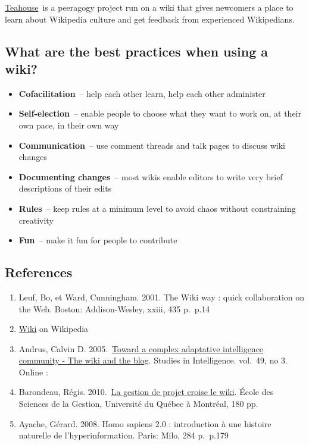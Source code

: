 \href{http://en.wikipedia.org/wiki/Wikipedia:Teahouse}{Teahouse}~is a
peeragogy project run on a wiki that gives newcomers a place to learn
about Wikipedia culture and get feedback from experienced Wikipedians.

\subsection{What are the best practices when using a
wiki?}\label{what-are-the-best-practices-when-using-a-wiki}

\begin{itemize}
\itemsep1pt\parskip0pt
\item
  \textbf{Cofacilitation}~-- help each other learn, help each other
  administer
\item
  \textbf{Self-election}~-- enable people to choose what they want to
  work on, at their own pace, in their own way
\item
  \textbf{Communication}~-- use comment threads and talk pages to
  discuss wiki changes
\item
  \textbf{Documenting changes}~-- most wikis enable editors to write
  very brief descriptions of their edits
\item
  \textbf{Rules}~-- keep rules at a minimum level to avoid chaos without
  constraining creativity
\item
  \textbf{Fun}~-- make it fun for people to contribute
\end{itemize}

\subsection{References}\label{references}

\begin{enumerate}
\def\labelenumi{\arabic{enumi}.}
\item
  Leuf, Bo, et Ward, Cunningham. 2001. The Wiki way : quick
  collaboration on the Web. Boston: Addison-Wesley, xxiii, 435 p.~p.14
\item
  \href{http://en.wikipedia.org/wiki/Wiki}{Wiki} on Wikipedia
\item
  Andrus, Calvin D. 2005.~\href{http://ssrn.com/abstract=755904}{Toward
  a complex adaptative intelligence community - The wiki and the blog}.
  Studies in Intelligence. vol.~49, no 3. Online :
\item
  Barondeau, Régis.
  2010.~\href{http://www.regisbarondeau.com/Chapitre+4\%3A+Analyse+du+cas\#Synth_se}{La
  gestion de projet croise le wiki}. École des Sciences de la Gestion,
  Université du Québec à Montréal, 180 pp.
\item
  Ayache, Gérard. 2008. Homo sapiens 2.0 : introduction à une histoire
  naturelle de l'hyperinformation. Paris: Milo, 284 p.~p.179
\end{enumerate}
